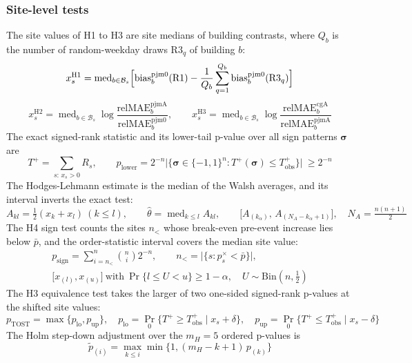 \subsubsection*{Site-level tests}
The site values of H1 to H3 are site medians of building contrasts, where $Q_b$ is the number of random-weekday draws R3$_q$ of building $b$:
\begin{equation}\label{eq:h1}
x^{\mathrm{H1}}_{s}=\operatorname{med}_{b\in\mathcal{B}_{s}}\Bigl[\mathrm{bias}^{\mathrm{pjm0}}_{b}(\mathrm{R1})-\frac{1}{Q_{b}}\sum_{q=1}^{Q_{b}}\mathrm{bias}^{\mathrm{pjm0}}_{b}(\mathrm{R3}_{q})\Bigr]
\end{equation}
\begin{equation}\label{eq:h23}
x^{\mathrm{H2}}_{s}=\operatorname{med}_{b\in\mathcal{B}_{s}}\log\frac{\mathrm{relMAE}^{\mathrm{pjmA}}_{b}}{\mathrm{relMAE}^{\mathrm{pjm0}}_{b}},\qquad x^{\mathrm{H3}}_{s}=\operatorname{med}_{b\in\mathcal{B}_{s}}\log\frac{\mathrm{relMAE}^{\mathrm{cgA}}_{b}}{\mathrm{relMAE}^{\mathrm{pjmA}}_{b}}
\end{equation}
The exact signed-rank statistic and its lower-tail p-value over all sign patterns $\boldsymbol{\sigma}$ are
\begin{equation}\label{eq:sr}
T^{+}=\sum_{s:\,x_{s}>0}R_{s},\qquad p_{\mathrm{lower}}=2^{-n}\bigl\lvert\{\boldsymbol{\sigma}\in\{-1,1\}^{n}:T^{+}(\boldsymbol{\sigma})\le T^{+}_{\mathrm{obs}}\}\bigr\rvert\ \ge 2^{-n}
\end{equation}
The Hodges-Lehmann estimate is the median of the Walsh averages, and its interval inverts the exact test:
\begin{equation}\label{eq:hl}
A_{kl}=\tfrac{1}{2}(x_{k}+x_{l})\ (k\le l),\qquad \hat{\theta}=\operatorname{med}_{k\le l}A_{kl},\qquad \bigl[A_{(k_{\alpha})},\,A_{(N_{A}-k_{\alpha}+1)}\bigr],\quad N_{A}=\tfrac{n(n+1)}{2}
\end{equation}
The H4 sign test counts the sites $n_{<}$ whose break-even pre-event increase lies below $\bar{p}$, and the order-statistic interval covers the median site value:
\begin{equation}\label{eq:sign}
\begin{gathered}
p_{\mathrm{sign}}=\sum_{i=n_{<}}^{n}\binom{n}{i}2^{-n},\qquad n_{<}=\lvert\{s:p^{\times}_{s}<\bar{p}\}\rvert,\\
\bigl[x_{(l)},x_{(u)}\bigr]\ \text{with}\ \Pr\{l\le U<u\}\ge 1-\alpha,\quad U\sim\mathrm{Bin}(n,\tfrac{1}{2})
\end{gathered}
\end{equation}
The H3 equivalence test takes the larger of two one-sided signed-rank p-values at the shifted site values:
\begin{equation}\label{eq:tost}
p_{\mathrm{TOST}}=\max\{p_{\mathrm{lo}},p_{\mathrm{up}}\},\quad p_{\mathrm{lo}}=\Pr_{0}\{T^{+}\ge T^{+}_{\mathrm{obs}}\mid x_{s}+\delta\},\quad p_{\mathrm{up}}=\Pr_{0}\{T^{+}\le T^{+}_{\mathrm{obs}}\mid x_{s}-\delta\}
\end{equation}
The Holm step-down adjustment over the $m_H=5$ ordered p-values is
\begin{equation}\label{eq:holm}
\tilde{p}_{(i)}=\max_{k\le i}\min\bigl\{1,(m_{H}-k+1)\,p_{(k)}\bigr\}
\end{equation}

